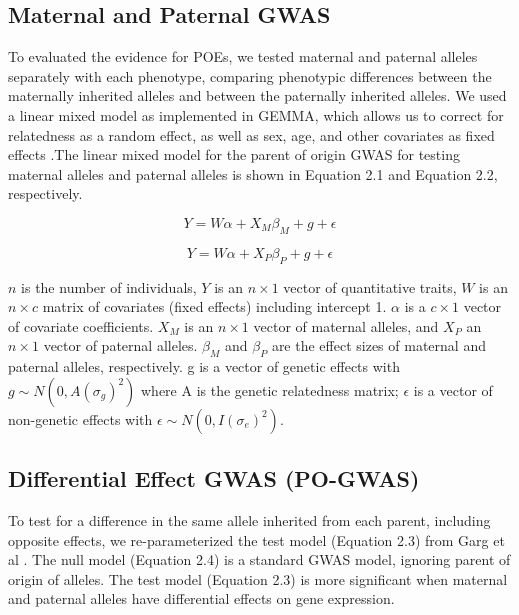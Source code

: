 \subsection{Maternal and Paternal GWAS}\label{Maternal and Paternal GWAS Methods}
To evaluated the evidence for POEs, we tested maternal and paternal alleles separately with each phenotype, comparing phenotypic differences between the maternally inherited alleles and between the paternally inherited alleles. We used a linear mixed model as implemented in GEMMA, which allows us to correct for relatedness as a random effect, as well as sex, age, and other covariates as fixed effects \cite{Zhou2012}.The linear mixed model for the parent of origin GWAS for testing maternal alleles and paternal alleles is shown in Equation 2.1 and Equation 2.2, respectively. 

\begin{equation}
Y =W\alpha + X_{M}\beta_{M}+g+\epsilon
\end{equation}

\begin{equation}
Y =W\alpha + X_{P}\beta_{P}+g+\epsilon
\end{equation}

$n$ is the number of individuals, $Y$ is an $n \times 1$ vector of quantitative traits, $W$ is an $n \times c$ matrix of covariates (fixed effects) including intercept 1. $\alpha$ is a $c \times 1$ vector of covariate coefficients. $X_M$  is an $n \times 1$ vector of maternal alleles, and $X_P$ an $n \times 1$ vector of paternal alleles. $\beta_M$ and $\beta_P$ are the effect sizes of maternal and paternal alleles, respectively. g is a vector of genetic effects with $g \sim N(0, A(\sigma_g)^2 )$ where A is the genetic relatedness matrix; $\epsilon$ is a vector of non-genetic effects with $\epsilon \sim N(0,I(\sigma_e)^2)$.

\subsection{Differential Effect GWAS (PO-GWAS)}\label{Differential Effect GWAS (PO-GWAS)}
To test for a difference in the same allele inherited from each parent, including opposite effects, we re-parameterized the test model (Equation 2.3) from Garg et al \cite{Garg2012a}. The null model (Equation 2.4) is a standard GWAS model, ignoring parent of origin of alleles. The test model (Equation 2.3) is more significant when maternal and paternal alleles have differential effects on gene expression.

